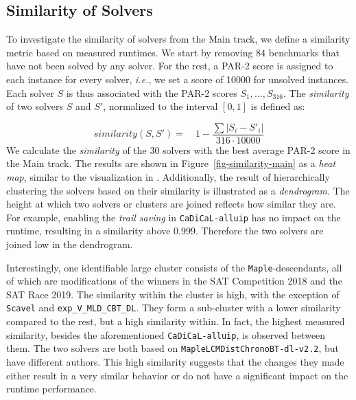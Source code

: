 \documentclass{elsarticle}
\newcommand{\solver}[1]{\texttt{#1}}
\begin{document}
\subsection{Similarity of Solvers}
To investigate the similarity of solvers from the Main track, we define a
similarity metric based on measured runtimes. We start by removing $84$
benchmarks that have not been solved by any solver. For the rest, a PAR-2 score
is assigned to each instance for every solver,
\emph{i.e.}, we set a score of \num{10000} for unsolved instances.
Each solver $S$ is thus associated with the PAR-2 scores $S_{1},\dots,S_{316}$.
The \emph{similarity} of two solvers $S$
and $S'$, normalized to the interval $[0,1]$ is defined
as:

\[
	similarity(S, S') =\quad 1 - \frac{\sum{|S_{i} - S'_{i}|}}{316 \cdot \num{10000}}
\]
We calculate the \emph{similarity} of the $30$ solvers with the
best average PAR-2 score in the Main track. The results are shown in
Figure~\ref{fig-similarity-main} as a \emph{heat map}, similar to the visualization in \cite{Balyo:2015:SATRace}. Additionally, the result
of hierarchically clustering the solvers based on their similarity is
illustrated as a \emph{dendrogram}. The height at which two solvers or clusters
are joined reflects how similar they are. For example, enabling the \emph{trail
  saving} in \solver{CaDiCaL-alluip} has no impact on the runtime, resulting in
a similarity above \num{0.999}. Therefore the two solvers are joined low in the
dendrogram.

Interestingly, one identifiable large cluster consists of the \solver{Maple}-descendants,
all of which are modifications of the winners in the SAT Competition 2018 and
the SAT Race 2019.
The similarity within the cluster is high, with the exception of
\solver{Scavel} and \solver{exp\_V\_MLD\_CBT\_DL}.
They form a sub-cluster
with a lower similarity compared to the rest, but a high similarity within. In fact, the highest measured similarity,
besides the aforementioned \solver{CaDiCaL-alluip}, is observed between them.
The two solvers are both based on
\solver{MapleLCMDistChronoBT-dl-v2.2}, but have different authors.
This high similarity suggests that the
changes they made either result in a very similar behavior or do not have a
significant impact on the runtime performance.
\end{document}
